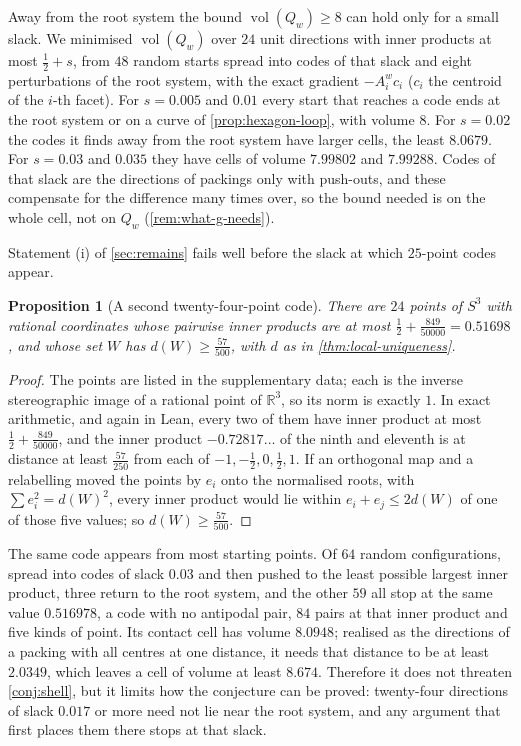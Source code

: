 \documentclass[11pt,reqno]{amsart}
\renewcommand{\_}{\origunderscore\allowbreak}
\numberwithin{equation}{section}
\theoremstyle{plain}
\newtheorem{prop}[thm]{Proposition}
\theoremstyle{definition}
\theoremstyle{remark}
\DeclareMathOperator{\vol}{vol}
\begin{document}
Away from the root system the bound $\vol(Q_w)\ge8$ can hold only for a
small slack. We minimised $\vol(Q_w)$
over $24$ unit directions with inner products at most $\tfrac12+s$, from
$48$ random starts spread into codes of that slack and eight perturbations
of the root system, with the exact gradient $-A_i^wc_i$ ($c_i$ the centroid
of the $i$-th facet). For $s=0.005$ and $0.01$ every start that reaches a
code ends at the root system or on a curve of \cref{prop:hexagon-loop},
with volume $8$. For $s=0.02$ the codes it finds away from the root system
have larger cells, the least $8.0679$. For $s=0.03$ and $0.035$ they have
cells of volume $7.99802$ and $7.99288$. Codes of that slack are the
directions of packings only with push-outs, and these compensate for the
difference many times over, so the bound needed is on the whole cell, not on
$Q_w$ (\cref{rem:what-g-needs}).

Statement (i) of \cref{sec:remains} fails well before the slack at
which $25$-point codes appear.

\begin{prop}[A second twenty-four-point code]\label{prop:second-code}
There are $24$ points of $S^3$ with rational coordinates whose pairwise inner
products are at most $\tfrac12+\tfrac{849}{50000}=0.51698$, and whose set $W$
has $d(W)\ge\tfrac{57}{500}$, with $d$ as in \cref{thm:local-uniqueness}.
\end{prop}

\begin{proof}
The points are listed in the supplementary data; each is the inverse
stereographic image of a rational point of $\mathbb{R}^3$, so its norm is
exactly $1$. In exact arithmetic, and again in Lean, every
two of them have inner product at most $\tfrac12+\tfrac{849}{50000}$, and
the inner product $-0.72817\ldots$ of the ninth and eleventh is at distance
at least $\tfrac{57}{250}$ from each of $-1,-\tfrac12,0,\tfrac12,1$. If an
orthogonal map and a relabelling moved the points by $e_i$ onto the
normalised roots, with $\sum e_i^2=d(W)^2$, every inner product would lie
within $e_i+e_j\le2d(W)$ of one of those five values; so
$d(W)\ge\tfrac{57}{500}$.
\end{proof}

The same code appears from most starting points. Of $64$ random configurations,
spread into codes of slack $0.03$ and then pushed to the least possible
largest inner product, three return to the root system, and the other $59$
all stop at the same value
$0.516978$, a code with no antipodal pair, $84$ pairs at that inner product
and five kinds of point. Its contact cell has volume $8.0948$; realised as
the directions of a packing with all centres at one distance, it needs that
distance to be at least $2.0349$, which leaves a cell of volume at least
$8.674$. Therefore it does not threaten
\cref{conj:shell}, but it limits how the conjecture can be proved:
twenty-four directions of slack $0.017$ or more need not lie near the root
system, and any argument that first places them there stops at that slack.
\end{document}
